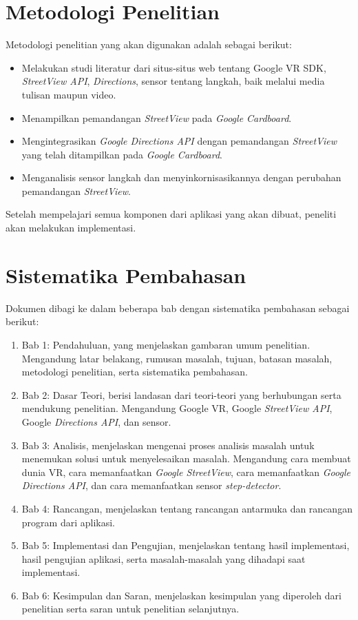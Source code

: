 \section{Metodologi Penelitian}
\label{sec:metlit}
Metodologi penelitian yang akan digunakan adalah sebagai berikut:
\begin{itemize}
	\item Melakukan studi literatur dari situs-situs web tentang Google VR SDK, \textit{StreetView API}, \textit{Directions}, sensor tentang langkah, baik melalui media tulisan maupun video.
	\item Menampilkan pemandangan {\it StreetView} pada {\it Google Cardboard}.
	\item Mengintegrasikan {\it Google Directions API} dengan pemandangan {\it StreetView} yang telah ditampilkan pada {\it Google Cardboard}.
	\item Menganalisis sensor langkah dan menyinkornisasikannya dengan perubahan pemandangan \textit{StreetView}.
\end{itemize}

Setelah mempelajari semua komponen dari aplikasi yang akan dibuat, peneliti akan melakukan implementasi. 

\section{Sistematika Pembahasan}
\label{sec:sispem}
Dokumen dibagi ke dalam beberapa bab dengan sistematika pembahasan sebagai berikut:
\begin{enumerate}
	\item Bab 1: Pendahuluan, yang menjelaskan gambaran umum penelitian. Mengandung latar belakang, rumusan masalah, tujuan, batasan masalah, metodologi penelitian, serta sistematika pembahasan.
	\item Bab 2: Dasar Teori, berisi landasan dari teori-teori yang berhubungan serta mendukung penelitian. Mengandung Google VR, Google {\it StreetView API}, Google {\it Directions API}, dan sensor.
	\item Bab 3: Analisis, menjelaskan mengenai proses analisis masalah untuk menemukan solusi untuk menyelesaikan masalah. Mengandung cara membuat dunia VR, cara memanfaatkan \textit{Google StreetView}, cara memanfaatkan \textit{Google Directions API}, dan cara memanfaatkan sensor \textit{step-detector}. 
	\item Bab 4: Rancangan, menjelaskan tentang rancangan antarmuka dan rancangan program dari aplikasi.
	\item Bab 5: Implementasi dan Pengujian, menjelaskan tentang hasil implementasi, hasil pengujian aplikasi, serta masalah-masalah yang dihadapi saat implementasi.
	\item Bab 6: Kesimpulan dan Saran, menjelaskan kesimpulan yang diperoleh dari penelitian serta saran  untuk penelitian selanjutnya.
\end{enumerate}
